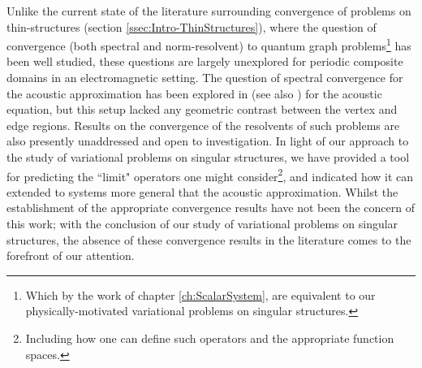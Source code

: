 Unlike the current state of the literature surrounding convergence of problems on thin-structures (section \ref{ssec:Intro-ThinStructures}), where the question of convergence (both spectral and norm-resolvent) to quantum graph problems\footnote{Which by the work of chapter \ref{ch:ScalarSystem}, are equivalent to our physically-motivated variational problems on singular structures.} has been well studied, these questions are largely unexplored for periodic composite domains in an electromagnetic setting.
The question of spectral convergence for the acoustic approximation has been explored in \cite{figotin1998spectral} (see also \cite[section 7.5]{kuchment2000mathematics}) for the acoustic equation, but this setup lacked any geometric contrast between the vertex and edge regions.
Results on the convergence of the resolvents of such problems are also presently unaddressed and open to investigation.
In light of our approach to the study of variational problems on singular structures, we have provided a tool for predicting the ``limit" operators one might consider\footnote{Including how one can define such operators and the appropriate function spaces.}, and indicated how it can extended to systems more general that the acoustic approximation.
Whilst the establishment of the appropriate convergence results have not been the concern of this work; with the conclusion of our study of variational problems on singular structures, the absence of these convergence results in the literature comes to the forefront of our attention.